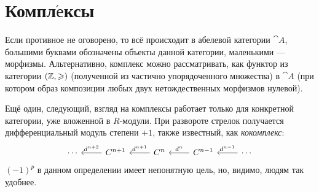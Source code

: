 \documentclass[a4paper]{report}
\begin{document}
    \section{Компл$\acute{\text{е}}$ксы}
    Если противное не оговорено, то всё происходит в абелевой категории $\cat A$, большими буквами обозначены объекты данной категории, маленькими --- морфизмы.
    Альтернативно, комплекс можно рассматривать, как функтор из категории $(\mathbb{Z}, \geqslant)$ (полученной из частично упорядоченного множества) в $\cat A$ (при котором образ композиции любых двух нетождественных морфизмов нулевой).

    Ещё один, следующий, взгляд на комплексы работает только для конкретной категории, уже вложенной в $R$-модули.
    При развороте стрелок получается дифференциальный модуль степени $+1$, также известный, как \emph{кокомплекс}:
    \[\begin{tikzcd}[ampersand replacement=\&]
          \cdots \& {C^{n+1}} \& {C^{n}} \& {C^{n-1}} \& \cdots
          \arrow["{d^{n+2}}"', from=1-2, to=1-1]
          \arrow["{d^{n+1}}"', from=1-3, to=1-2]
          \arrow["{d^n}"', from=1-4, to=1-3]
          \arrow["{d^{n-1}}"', from=1-5, to=1-4]
    \end{tikzcd}\]
    $(-1)^p$ в данном определении имеет непонятную цель, но, видимо, людям так удобнее.
\end{document}

